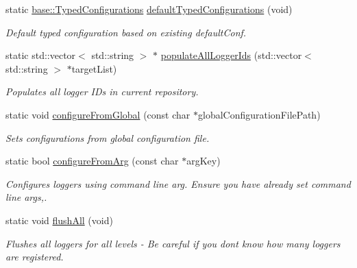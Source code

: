 \begin{DoxyCompactItemize}
static \hyperlink{classel_1_1base_1_1_typed_configurations}{base\+::\+Typed\+Configurations} \hyperlink{classel_1_1_loggers_af296007c3eb3b71602ec80ff59875b46}{default\+Typed\+Configurations} (void)
\begin{DoxyCompactList}\small\item\em Default typed configuration based on existing default\+Conf. \end{DoxyCompactList}\item 
static std\+::vector$<$ std\+::string $>$ $\ast$ \hyperlink{classel_1_1_loggers_adea07ec6cbc1dfc50f939d69dcac7160}{populate\+All\+Logger\+Ids} (std\+::vector$<$ std\+::string $>$ $\ast$target\+List)
\begin{DoxyCompactList}\small\item\em Populates all logger I\+Ds in current repository. \end{DoxyCompactList}\item 
\mbox{\label{classel_1_1_loggers_a9992995a85745639aa9aa5a2df2255f5}} 
static void \hyperlink{classel_1_1_loggers_a9992995a85745639aa9aa5a2df2255f5}{configure\+From\+Global} (const char $\ast$global\+Configuration\+File\+Path)
\begin{DoxyCompactList}\small\item\em Sets configurations from global configuration file. \end{DoxyCompactList}\item 
static bool \hyperlink{classel_1_1_loggers_a28acf6f2b1ea7e5edd1b2560cde82406}{configure\+From\+Arg} (const char $\ast$arg\+Key)
\begin{DoxyCompactList}\small\item\em Configures loggers using command line arg. Ensure you have already set command line args,. \end{DoxyCompactList}\item 
\mbox{\label{classel_1_1_loggers_a1834480e970c16817459ca3ee26b44b5}} 
static void \hyperlink{classel_1_1_loggers_a1834480e970c16817459ca3ee26b44b5}{flush\+All} (void)
\begin{DoxyCompactList}\small\item\em Flushes all loggers for all levels -\/ Be careful if you dont know how many loggers are registered. \end{DoxyCompactList}\item 
\mbox{\label{classel_1_1_loggers_aedd2de02dd701b0f20ddaa10f1f728f1}} 

\end{DoxyCompactItemize}
